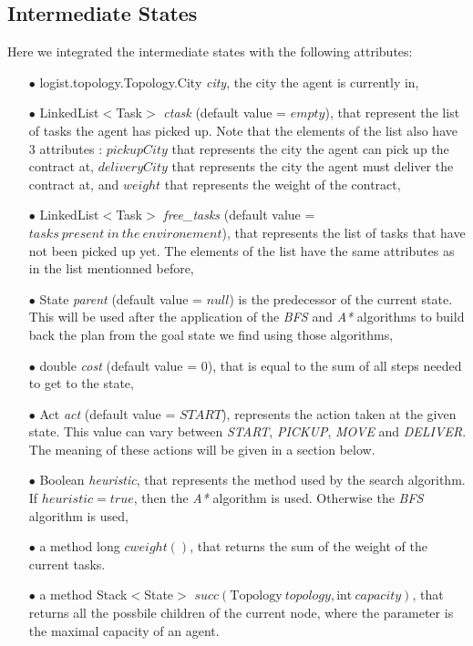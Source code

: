\documentclass[11pt]{article}
\begin{document}
\subsection{Intermediate States}
Here we integrated the intermediate states with the following attributes:
\begin{itemize}
	\item[$\bullet$] logist.topology.Topology.City \emph{city}, the city the agent is currently in,
	\item[$\bullet$] LinkedList$<$Task$>$ \emph{ctask} (default value = $empty$), that represent the list of tasks the agent has picked up. Note that the elements of the list also have 3 attributes : $pickupCity$ that represents the city the agent can pick up the contract at, $deliveryCity$ that represents the city the agent must deliver the contract at, and $weight$ that represents the weight of the contract,
	\item[$\bullet$] LinkedList$<$Task$>$ \emph{free\_tasks} (default value = $tasks\ present\ in\ the\ environement$), that represents the list of tasks that have not been picked up yet. The elements of the list have the same attributes as in the list mentionned before,
	\item[$\bullet$] State \emph{parent} (default value = $null$) is the predecessor of the current state. This will be used after the application of the \emph{BFS} and \emph{A*} algorithms to build back the plan from the goal state we find using those algorithms,
	\item[$\bullet$] double \emph{cost} (default value = $0$), that is equal to the sum of all steps needed to get to the state, 
	\item[$\bullet$] Act \emph{act} (default value = $START$), represents the action taken at the given state. This value can vary between \emph{START}, \emph{PICKUP}, \emph{MOVE} and \emph{DELIVER}. The meaning of these actions will be given in a section below.
	\item[$\bullet$] Boolean \emph{heuristic}, that represents the method used by the search algorithm. If $heuristic=true$, then the \emph{A*} algorithm is used. Otherwise the \emph{BFS} algorithm is used,
	\item[$\bullet$] a method long $cweight()$, that returns the sum of the weight of the current tasks.
	\item[$\bullet$] a method Stack$<$State$>$ $succ(\mathrm{Topology}\ topology,\mathrm{int}\ capacity) $, that returns all the possbile children of the current node, where the parameter is the maximal capacity of an agent.
\end{itemize}
\end{document}

